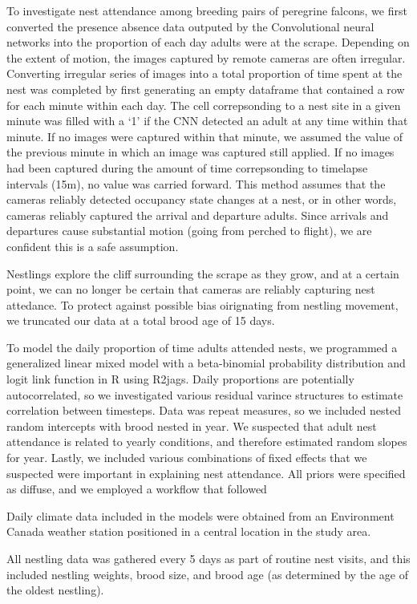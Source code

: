 To investigate nest attendance among breeding pairs of peregrine falcons, we first converted the presence absence data outputed by the Convolutional neural networks into the proportion of each day adults were at the scrape.
Depending on the extent of motion, the images captured by remote cameras are often irregular.
Converting irregular series of images into a total proportion of time spent at the nest was completed by first generating an empty dataframe that contained a row for each minute within each day. 
The cell correpsonding to a nest site in a given minute was filled with a `1' if the CNN detected an adult at any time within that minute.
If no images were captured within that minute, we assumed the value of the previous minute in which an image was captured still applied.
If no images had been captured during the amount of time correpsonding to timelapse intervals (15m), no value was carried forward.
This method assumes that the cameras reliably detected occupancy state changes at a nest, or in other words, cameras reliably captured the arrival and departure adults.
Since arrivals and departures cause substantial motion (going from perched to flight), we are confident this is a safe assumption.

Nestlings explore the cliff surrounding the scrape as they grow, and at a certain point, we can no longer be certain that cameras are reliably capturing nest attedance.
To protect against possible bias oirignating from nestling movement, we truncated our data at a total brood age of 15 days.
 



To model the daily proportion of time adults attended nests, we programmed a generalized linear mixed model with a beta-binomial probability distribution and logit link function in R using R2jags. 
Daily proportions are potentially autocorrelated, so we investigated various residual varince structures to estimate correlation between timesteps.
Data was repeat measures, so we included nested random intercepts with brood nested in year.
We suspected that adult nest attendance is related to yearly conditions, and therefore estimated random slopes for year.
Lastly, we included various combinations of fixed effects that we suspected were important in explaining nest attendance. 
All priors were specified as diffuse, and we employed a workflow that followed \cite{} %



Daily climate data included in the models were obtained from an Environment Canada weather station positioned in a central location in the study area. 

All nestling data was gathered every 5 days as part of routine nest visits, and this included nestling weights, brood size, and brood age (as determined by the age of the oldest nestling).

